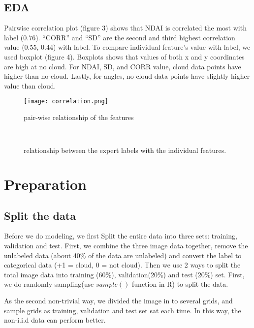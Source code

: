 \documentclass[12pt]{extarticle}
\begin{document}
\subsection{EDA}
Pairwise correlation plot (figure 3) shows that NDAI is correlated the most with label (0.76). “CORR” and “SD” are the second and third highest correlation value (0.55, 0.44) with label. To compare individual feature’s value with label, we used boxplot (figure 4). Boxplots shows that values of both x and y coordinates are high at no cloud. For NDAI, SD, and CORR value, cloud data points have higher than no-cloud. Lastly, for angles, no cloud data points have slightly higher value than cloud.




\begin{figure}[htb]
	\centering
	\texttt{[image: correlation.png]}
	\caption{pair-wise relationship of the features}\label{fig 2}
\end{figure}


\begin{figure}[htb]
\centering
{}
\quad
{}
\\

\caption{relationship between the expert labels with the individual features.}\label{fig 1}
\end{figure}


\section{Preparation}

\subsection{Split the data}
Before we do modeling, we first Split the entire data into three sets: training, validation and test.
First, we combine the three image data together, remove the unlabeled data (about 40\% of the data are unlabeled) and convert the label to categorical data (+1 = cloud, 0 = not cloud). Then we use 2 ways to split the total image data into training (60\%), validation(20\%) and test (20\%) set.
First, we do randomly sampling(use $sample()$ function in R) to split the data.

As the second non-trivial way, we divided the image in to several grids, and sample grids as training, validation and test set sat each time. In this way, the non-i.i.d data can perform better.
\end{document}
